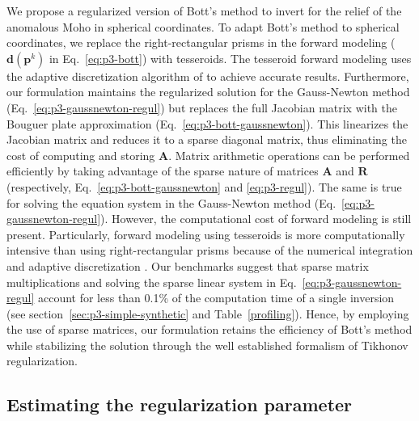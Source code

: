 We propose a regularized version of Bott's method to invert for the relief of
the anomalous Moho in spherical coordinates.
To adapt Bott's method to spherical coordinates,
we replace the right-rectangular prisms in the forward modeling
($\mathbf{d}(\mathbf{p}^k)$ in Eq.~\ref{eq:p3-bott})
with tesseroids.
The tesseroid forward modeling uses the adaptive discretization algorithm
of \citet{uieda2016} to achieve accurate results.
Furthermore, our formulation maintains the regularized solution
for the Gauss-Newton method (Eq.~\ref{eq:p3-gaussnewton-regul})
but replaces the full Jacobian matrix with the Bouguer plate approximation
(Eq.~\ref{eq:p3-bott-gaussnewton}).
This linearizes the Jacobian matrix and reduces it to a sparse diagonal matrix,
thus eliminating the cost of computing and storing $\mathbf{A}$.
Matrix arithmetic operations can be performed efficiently by taking advantage
of the sparse nature of matrices $\mathbf{A}$ and $\mathbf{R}$
(respectively, Eq.~\ref{eq:p3-bott-gaussnewton} and \ref{eq:p3-regul}).
The same is true for solving the equation system in the Gauss-Newton method
(Eq.~\ref{eq:p3-gaussnewton-regul}).
However, the computational cost of forward modeling is still present.
Particularly, forward modeling using tesseroids is more computationally
intensive than using right-rectangular prisms
because of the numerical integration and adaptive discretization
\citep{uieda2016}.
Our benchmarks suggest that
sparse matrix multiplications and solving the sparse linear system
in Eq.~\ref{eq:p3-gaussnewton-regul}
account for less than 0.1\%
of the computation time of a single inversion
(see section~\ref{sec:p3-simple-synthetic} and Table~\ref{profiling}).
Hence, by employing the use of sparse matrices,
our formulation retains the efficiency of Bott's method
while stabilizing the solution through the well established formalism of
Tikhonov regularization.



\subsection{Estimating the regularization parameter}

